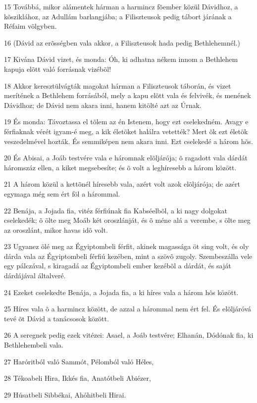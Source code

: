 \par 15 Továbbá, mikor alámentek hárman a harmincz fõember közül Dávidhoz, a kõsziklához, az Adullám barlangjába; a Filiszteusok pedig tábort járának a Réfaim völgyben.
\par 16 (Dávid az erõsségben vala akkor, a Filiszteusok hada pedig Bethlehemnél.)
\par 17 Kivána Dávid vizet, és monda: Óh, ki adhatna nékem innom a Bethlehem kapuja elõtt való forrásnak vizébõl!
\par 18 Akkor keresztülvágták magokat hárman a Filiszteusok táborán, és vizet merítének a Bethlehem forrásából, mely a kapu elõtt vala és felvivék, és menének Dávidhoz; de Dávid nem akara inni, hanem kitölté azt az Úrnak.
\par 19 És monda: Távoztassa el tõlem az én Istenem, hogy ezt cselekedném. Avagy e férfiaknak vérét igyam-é meg, a kik életöket halálra vetették? Mert õk ezt életök veszedelmével hozták. És semmiképen nem akara inni. Ezt cselekedé a három hõs.
\par 20 És Abisai, a Joáb testvére vala e háromnak elõljárója; õ ragadott vala dárdát háromszáz  ellen, a kiket megsebesíte; és õ volt a leghíresebb a három között.
\par 21 A három közül a kettõnél híresebb vala, azért volt azok elõljárója; de azért egymaga még sem ért föl a hárommal.
\par 22 Benája, a Jojada fia, vitéz férfiúnak fia Kabséelbõl, a ki nagy dolgokat cselekedék; õ ölte meg Moáb két oroszlánját, és õ méne alá a verembe, s ölte meg az oroszlánt, mikor havas idõ volt.
\par 23 Ugyanez ölé meg az Égyiptombeli férfit, akinek magassága öt sing volt, és oly dárda vala az Égyiptombeli férfiú kezében, mint a szövõ zugoly. Szembeszálla vele egy pálczával, s kiragadá az Égyiptombeli ember kezébõl a dárdát, és saját dárdájával általveré.
\par 24 Ezeket cselekedte Benája, a Jojada fia, a ki híres vala a három hõs között.
\par 25 Híres vala õ a harmincz között, de azzal a hárommal nem ért fel. És elõljáróvá tevé õt Dávid a tanácsosok között.
\par 26 A seregnek pedig ezek vitézei: Asael, a Joáb testvére; Elhanán, Dódónak fia, ki Bethlehembeli vala.
\par 27 Haróritból való Sammót, Pélomból való Héles,
\par 28 Tékoabeli Hira, Ikkés fia, Anatótbeli Abiézer,
\par 29 Húsatbeli Sibbékai, Ahóhitbeli Hirai.
